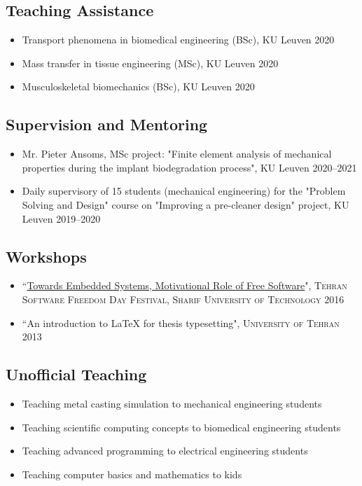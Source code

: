 \documentclass{cv}
\begin{document}
\subsection{Teaching Assistance}


\begin{itemize}
\item 
Transport phenomena in biomedical engineering (BSc), KU Leuven \hfill 2020
\item 
Mass transfer in tissue engineering (MSc), KU Leuven \hfill 2020
\item 
Musculoskeletal biomechanics (BSc), KU Leuven \hfill 2020
\end{itemize}
	
\subsection{Supervision and Mentoring}

\begin{itemize}
\item 
Mr. Pieter Ansoms, MSc project: "Finite element analysis of mechanical properties during the implant biodegradation process", KU Leuven \hfill 2020--2021
\item
Daily supervisory of 15 students (mechanical engineering) for the "Problem Solving and Design" course on "Improving a pre-cleaner design" project, KU Leuven \hfill 2019--2020
\end{itemize}

\subsection{Workshops}

\begin{itemize}
\item
``\href{https://www.slideshare.net/tehsfd/embedded-system-70659214}{Towards Embedded Systems, Motivational Role of Free Software}", \textsc{Tehran Software Freedom Day Festival, Sharif University of Technology} \hfill 2016
\item
``An introduction to \LaTeX{} for thesis typesetting", \textsc{University of Tehran} \hfill 2013
\end{itemize}


\subsection{Unofficial Teaching}

\begin{itemize}
\item
Teaching metal casting simulation to mechanical engineering students
\item
Teaching scientific computing concepts to biomedical engineering students
\item
Teaching advanced programming to electrical engineering students
\item
Teaching computer basics and mathematics to kids
\end{itemize}
\end{document}
